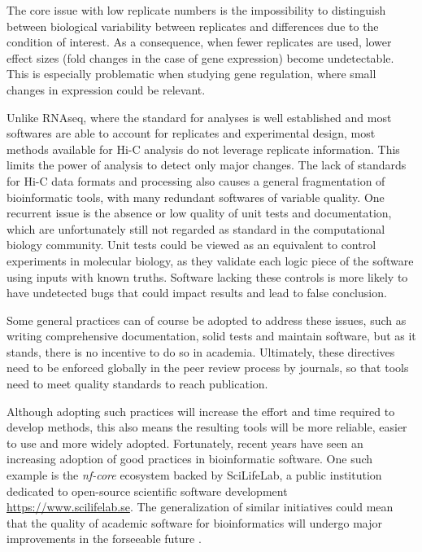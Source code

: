 The core issue with low replicate numbers is the impossibility to distinguish between biological variability between replicates and differences due to the condition of interest. As a consequence, when fewer replicates are used, lower effect sizes (fold changes in the case of gene expression) become undetectable. This is especially problematic when studying gene regulation, where small changes in expression could be relevant.


Unlike RNAseq, where the standard for analyses is well established and most softwares are able to account for replicates and experimental design, most methods available for Hi-C analysis do not leverage replicate information. This limits the power of analysis to detect only major changes. The lack of standards for Hi-C data formats and processing also causes a general fragmentation of bioinformatic tools, with many redundant softwares of variable quality. One recurrent issue is the absence or low quality of unit tests and documentation, which are unfortunately still not regarded as standard in the computational biology community. Unit tests could be viewed as an equivalent to control experiments in molecular biology, as they validate each logic piece of the software using inputs with known truths. Software lacking these controls is more likely to have undetected bugs that could impact results and lead to false conclusion.

Some general practices can of course be adopted to address these issues, such as writing comprehensive documentation, solid tests and maintain software, but as it stands, there is no incentive to do so in academia. Ultimately, these directives need to be enforced globally in the peer review process by journals, so that tools need to meet quality standards to reach publication.

Although adopting such practices will increase the effort and time required to develop methods, this also means the resulting tools will be more reliable, easier to use and more widely adopted. Fortunately, recent years have seen an increasing adoption of good practices in bioinformatic software. One such example is the \textit{nf-core} ecosystem backed by SciLifeLab, a public institution dedicated to open-source scientific software development \url{https://www.scilifelab.se}. The generalization of similar initiatives could mean that the quality of academic software for bioinformatics will undergo major improvements in the forseeable future \cite{ewelsNfcoreFrameworkCommunitycurated2020}.
